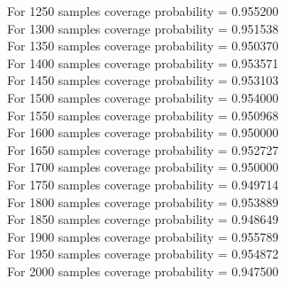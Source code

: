 \documentclass{article}
\begin{document}
For 1250 samples coverage probability = 0.955200\\
For 1300 samples coverage probability = 0.951538\\
For 1350 samples coverage probability = 0.950370\\
For 1400 samples coverage probability = 0.953571\\
For 1450 samples coverage probability = 0.953103\\
For 1500 samples coverage probability = 0.954000\\
For 1550 samples coverage probability = 0.950968\\
For 1600 samples coverage probability = 0.950000\\
For 1650 samples coverage probability = 0.952727\\
For 1700 samples coverage probability = 0.950000\\
For 1750 samples coverage probability = 0.949714\\
For 1800 samples coverage probability = 0.953889\\
For 1850 samples coverage probability = 0.948649\\
For 1900 samples coverage probability = 0.955789\\
For 1950 samples coverage probability = 0.954872\\
For 2000 samples coverage probability = 0.947500\\
\end{document}
